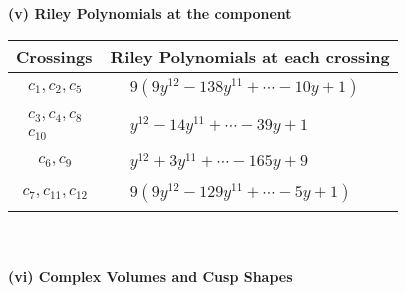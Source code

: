 \documentclass[1p]{elsarticle_modified}
\theoremstyle{definition}
\begin{document}
\flushleft \textbf{(v) Riley Polynomials at the component}\newline \\
\begin{tabular}{m{50pt}|m{274pt}}
Crossings & \hspace{64pt}Riley Polynomials at each crossing \\
\hline $$\begin{aligned}c_{1},c_{2},c_{5}\end{aligned}$$&$\begin{aligned}
&9(9 y^{12}-138 y^{11}+\cdots-10 y+1)
\end{aligned}$\\
\hline $$\begin{aligned}c_{3},c_{4},c_{8}\\c_{10}\end{aligned}$$&$\begin{aligned}
&y^{12}-14 y^{11}+\cdots-39 y+1
\end{aligned}$\\
\hline $$\begin{aligned}c_{6},c_{9}\end{aligned}$$&$\begin{aligned}
&y^{12}+3 y^{11}+\cdots-165 y+9
\end{aligned}$\\
\hline $$\begin{aligned}c_{7},c_{11},c_{12}\end{aligned}$$&$\begin{aligned}
&9(9 y^{12}-129 y^{11}+\cdots-5 y+1)
\end{aligned}$\\
\hline
\end{tabular}\\~\\
\newpage\flushleft \textbf{(vi) Complex Volumes and Cusp Shapes}
\end{document}
